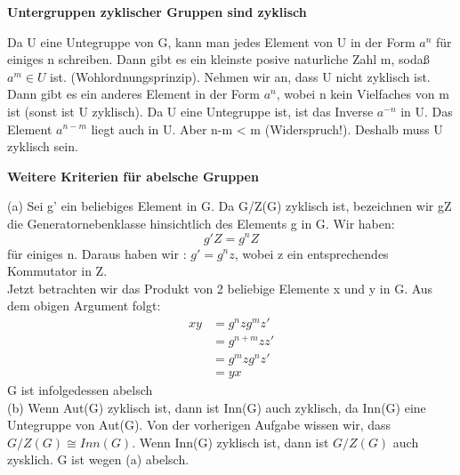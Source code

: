 \documentclass{homework}
\begin{document}
\begin{problem}
    \textbf{Untergruppen zyklischer Gruppen sind zyklisch}
\end{problem}

\begin{solution}
Da U eine Untegruppe von G, kann man jedes Element von U in der Form $a^{n}$ für einiges n schreiben. Dann gibt es ein kleinste posive naturliche Zahl m, sodaß $a^{m} \in U $ ist. (Wohlordnungsprinzip).
Nehmen wir an, dass U nicht zyklisch ist. Dann gibt es ein anderes Element in der Form $a^{n}$, wobei n kein Vielfaches von m ist (sonst ist U zyklisch). Da U eine Untegruppe ist, ist das Inverse $a^{-n}$ in U. Das Element $a^{n-m}$ liegt auch in U. Aber n-m < m (Widerspruch!). Deshalb muss U zyklisch sein.
\end{solution}

\begin{problem}
    \textbf{Weitere Kriterien für abelsche Gruppen}
\end{problem}

\begin{solution}
    (a) Sei g' ein beliebiges Element in G. Da G/Z(G) zyklisch ist, bezeichnen wir gZ die Generatornebenklasse hinsichtlich des Elements g in G. Wir haben:
    $$
        g'Z=g^{n}Z
    $$
    für einiges n. Daraus haben wir : $g'=g^{n}z$, wobei z ein entsprechendes Kommutator in Z. \\
    Jetzt betrachten wir das Produkt von 2 beliebige Elemente x und y in G. Aus dem obigen Argument folgt:
    \begin{align*}
        xy &= g^{n}zg^{m}z' \\
           &= g^{n+m}zz'  \tag*{(da z und z' Kommutatoren in G sind)}\\
           &= g^{m}zg^{n}z' \tag*{(Addition ist kommutativ)} \\
           &= yx
    \end{align*}
    G ist infolgedessen abelsch \\
    (b) Wenn Aut(G) zyklisch ist, dann ist Inn(G) auch zyklisch, da Inn(G) eine Untegruppe von Aut(G). Von der vorherigen Aufgabe wissen wir, dass $G/Z(G)\cong Inn(G)$. Wenn Inn(G) zyklisch ist, dann ist $G/Z(G)$ auch zysklich. G ist wegen (a) abelsch.
\end{solution}
\end{document}
